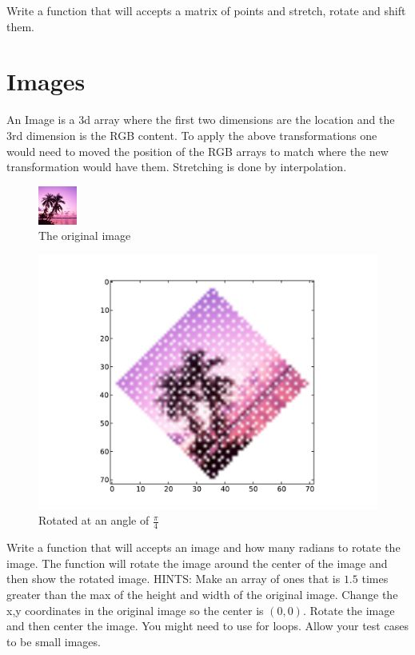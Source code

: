 \begin{problem}
Write a function that will accepts a matrix of points and stretch, rotate and shift them.
\end{problem}

\section*{Images}

An Image is a 3d array where the first two dimensions are the location and the 3rd dimension is the RGB content.
To apply the above transformations one would need to moved the position of the RGB arrays to match where the new transformation would have them.
Stretching is done by interpolation.

\begin{figure}[H]
\includegraphics[scale = 2.0]{dream.png}
\caption{The original image}
\end{figure}

\begin{figure}[H]
\includegraphics[scale = .5]{rotateimg.pdf}
\caption{Rotated at an angle of $\frac{\pi}{4}$}
\end{figure}

\begin{problem}
Write a function that will accepts an image and how many radians to rotate the image.
The function will rotate the image around the center of the image and then show the rotated image.
HINTS: Make an array of ones that is $1.5$ times greater than the max of the height and width of the original image.
Change the x,y coordinates in the original image so the center is $(0,0)$.
Rotate the image and then center the image.
You might need to use for loops.
Allow your test cases to be small images.
\end{problem}


